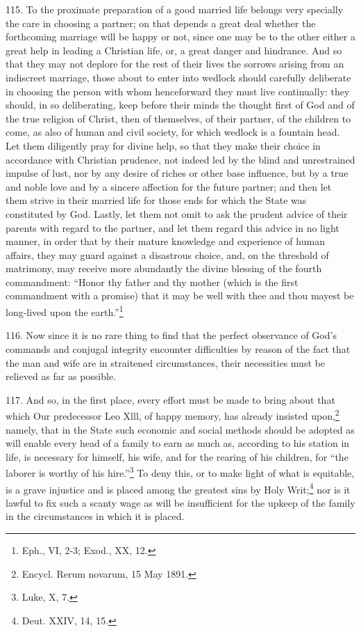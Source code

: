 \documentclass[12pt,a4paper]{book}
\begin{document}
115. To the proximate preparation of a good married life belongs very specially the care in choosing a partner; on that depends a great deal whether the forthcoming marriage will be happy or not, since one may be to the other either a great help in leading a Christian life, or, a great danger and hindrance. And so that they may not deplore for the rest of their lives the sorrows arising from an indiscreet marriage, those about to enter into wedlock should carefully deliberate in choosing the person with whom henceforward they must live continually: they should, in so deliberating, keep before their minds the thought first of God and of the true religion of Christ, then of themselves, of their partner, of the children to come, as also of human and civil society, for which wedlock is a fountain head. Let them diligently pray for divine help, so that they make their choice in accordance with Christian prudence, not indeed led by the blind and unrestrained impulse of lust, nor by any desire of riches or other base influence, but by a true and noble love and by a sincere affection for the future partner; and then let them strive in their married life for those ends for which the State was constituted by God. Lastly, let them not omit to ask the prudent advice of their parents with regard to the partner, and let them regard this advice in no light manner, in order that by their mature knowledge and experience of human affairs, they may guard against a disastrous choice, and, on the threshold of matrimony, may receive more abundantly the divine blessing of the fourth commandment: ``Honor thy father and thy mother (which is the first commandment with a promise) that it may be well with thee and thou mayest be long-lived upon the earth.''\footnote{Eph., VI, 2-3; Exod., XX, 12.}

116. Now since it is no rare thing to find that the perfect observance of God's commands and conjugal integrity encounter difficulties by reason of the fact that the man and wife are in straitened circumstances, their necessities must be relieved as far as possible.

117. And so, in the first place, every effort must be made to bring about that which Our predecessor Leo Xlll, of happy memory, has already insisted upon,\footnote{Encycl. Rerum novarum, 15 May 1891.} namely, that in the State such economic and social methods should be adopted as will enable every head of a family to earn as much as, according to his station in life, is necessary for himself, his wife, and for the rearing of his children, for ``the laborer is worthy of his hire.''\footnote{Luke, X, 7.} To deny this, or to make light of what is equitable, is a grave injustice and is placed among the greatest sins by Holy Writ;\footnote{Deut. XXIV, 14, 15.} nor is it lawful to fix such a scanty wage as will be insufficient for the upkeep of the family in the circumstances in which it is placed.
\end{document}
